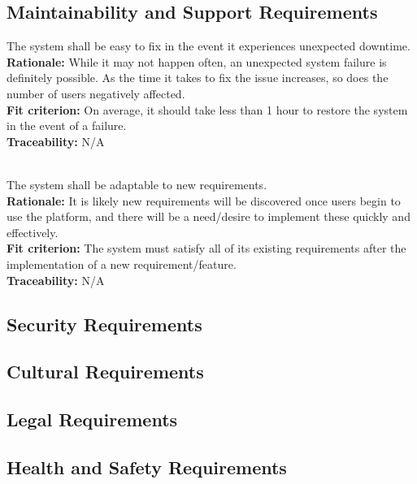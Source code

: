 \documentclass[12pt, titlepage]{article}
\newcounter{NFR_Counter}
\newcounter{FR_Counter}
\begin{document}
\subsection{Maintainability and Support Requirements}


The system shall be easy to fix in the event it experiences unexpected downtime.\\
\textbf{Rationale:}
While it may not happen often, an unexpected system failure is definitely possible. As the time it takes 
to fix the issue increases, so does the number of users negatively affected.\\
\textbf{Fit criterion:}
On average, it should take less than 1 hour to restore the system in the event of a failure.\\
\textbf{Traceability:}
N/A \\~\\
\addtocounter{NFR_Counter}{1}


The system shall be adaptable to new requirements.\\
\textbf{Rationale:}
It is likely new requirements will be discovered once users begin to use the platform, and there will be a need/desire to 
implement these quickly and effectively.\\
\textbf{Fit criterion:}
The system must satisfy all of its existing requirements after the implementation of a new requirement/feature.\\
\textbf{Traceability:}
N/A
\addtocounter{NFR_Counter}{1}


\subsection{Security Requirements}

\subsection{Cultural Requirements}

\subsection{Legal Requirements}

\subsection{Health and Safety Requirements}
\end{document}
